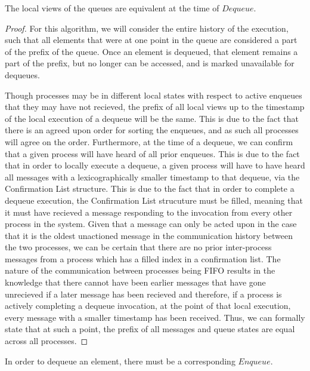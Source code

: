 \documentclass[a4paper,USenglish]{lipics-v2021} %
\begin{document}
\begin{lemma}
  The local views of the queues are equivalent at the time of $Dequeue$.
\end{lemma}

\begin{proof}
  For this algorithm, we will consider the entire history of the execution, such that all elements that were at one point in the queue are considered a part of the prefix of the queue. Once an element is dequeued, that element remains a part of the prefix, but no longer can be accessed, and is marked unavailable for dequeues.
  
Though processes may be in different local states with respect to active enqueues that they may have not recieved, the prefix of all local views up to the timestamp of the local execution of a dequeue will be the same. This is due to the fact that there is an agreed upon order for sorting the enqueues, and as such all processes will agree on the order. Furthermore, at the time of a dequeue, we can confirm that a given process will have heard of all prior enqueues. This is due to the fact that in order to locally execute a dequeue, a given process will have to have heard all messages with a lexicographically smaller timestamp to that dequeue, via the Confirmation List structure. This is due to the fact that in order to complete a dequeue execution, the Confirmation List strucuture must be filled, meaning that it must have recieved a message responding to the invocation from every other process in the system. Given that a message can only be acted upon in the case that it is the oldest unactioned message in the communication history between the two processes, we can be certain that there are no prior inter-process messages from a process which has a filled index in a confirmation list. The nature of the communication between processes being FIFO results in the knowledge that there cannot have been earlier messages that have gone unrecieved if a later message has been recieved and therefore, if a process is actively completing a dequeue invocation, at the point of that local execution, every message with a smaller timestamp has been received. Thus, we can formally state that at such a point, the prefix of all messages and queue states are equal across all processes.
\end{proof}

\begin{lemma}
In order to dequeue an element, there must be a corresponding $Enqueue$.
\end{lemma}
\end{document}
